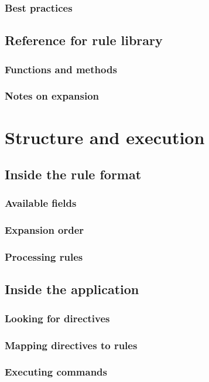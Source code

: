 \documentclass[a4paper,twoside,12pt]{memoir}
\begin{document}
\section{Best practices}

\chapter{Reference for rule library}
\section{Functions and methods}
\section{Notes on expansion}

\part{Structure and execution}

\chapter{Inside the rule format}
\section{Available fields}
\section{Expansion order}
\section{Processing rules}

\chapter{Inside the application}
\section{Looking for directives}
\section{Mapping directives to rules}
\section{Executing commands}
\end{document}
